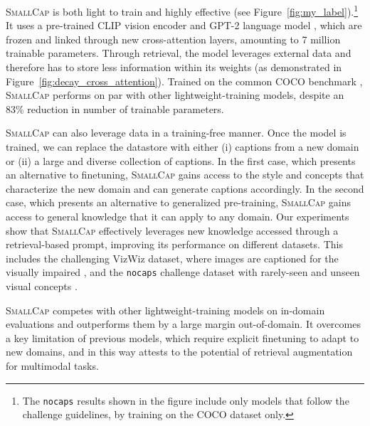 \documentclass[10pt,twocolumn,letterpaper]{article}
\newcommand{\model}{\textsc{SmallCap}\xspace}
\begin{document}
\textsc{SmallCap} is both light to train and highly effective (see Figure~\ref{fig:my_label}).\footnote{The \texttt{nocaps} results shown in the figure include only models that follow the challenge guidelines, by training on the COCO dataset only.}
It uses a pre-trained CLIP vision encoder \cite{radford2021learning} and GPT-2 language model \cite{radford2019language}, which are frozen and linked through new cross-attention layers, amounting to 7 million trainable parameters.
Through retrieval, the model leverages external data and therefore has to store less information within its 
weights (as demonstrated in Figure~\ref{fig:decay_cross_attention}). %
Trained on the common COCO benchmark \cite{chen2015microsoft}, \textsc{SmallCap} performs on par with other lightweight-training models, despite an 83\% reduction in number of trainable parameters. 

\textsc{SmallCap} can also leverage data in a training-free manner. Once the model is trained, we can replace the datastore with either (i) captions from a new domain or (ii) a large and diverse collection of captions. In the first case, which presents an alternative to finetuning, \textsc{SmallCap} gains access to the style and concepts that characterize the new domain and can generate captions accordingly. In the second case, which presents an alternative to generalized pre-training, \textsc{SmallCap} gains access to general knowledge that it can apply to any domain. Our experiments show that \textsc{SmallCap} effectively leverages new knowledge accessed through a retrieval-based prompt, improving its performance on different datasets. This includes the challenging VizWiz dataset, where images are captioned for the visually impaired \cite{gurari2020captioning}, and the \texttt{nocaps} challenge dataset with rarely-seen and unseen visual concepts \cite{Agrawal_2019}.

\model competes with other lightweight-training models on in-domain evaluations and outperforms them by a large margin out-of-domain. It overcomes a key limitation of previous models, which require explicit finetuning to adapt to new domains, and in this way attests to the potential of retrieval augmentation for multimodal tasks. 
\end{document}
